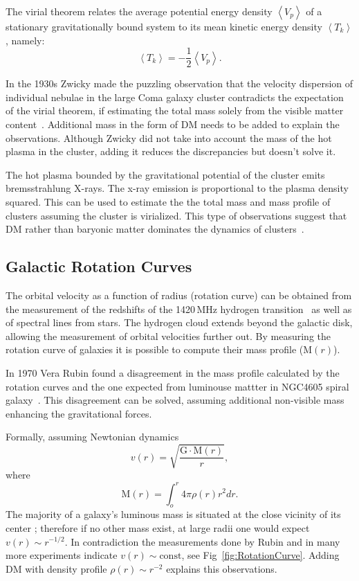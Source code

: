 The virial theorem relates the average potential energy density $\left\langle V_p \right\rangle$ of a stationary gravitationally bound system to its mean kinetic energy density $\left\langle T_k \right\rangle $, namely:
\begin{equation}
\left\langle T_k \right\rangle  =-\frac{1}{2}\left\langle V_p \right\rangle.
\end{equation}


In the 1930s Zwicky made the puzzling observation that the velocity dispersion of individual nebulae in the large Coma galaxy cluster contradicts the expectation of the virial theorem, if estimating the total mass solely from the visible matter content~\cite{Zwicky:1937zza}. Additional mass in the form of DM needs to be added to explain the observations. Although Zwicky did not take into account the mass of the hot plasma in the cluster, adding it reduces the discrepancies but doesn't solve it. 

The hot plasma bounded by the gravitational potential of the cluster emits bremsstrahlung X-rays. The x-ray emission is proportional to the plasma density squared. This can be used to estimate the the total mass and mass profile of clusters assuming the cluster is virialized. This type of observations suggest that DM rather than baryonic matter dominates the dynamics of clusters~\cite{Lewis:2002mfa}.

 


\subsection{Galactic Rotation Curves}

The orbital velocity as a function of radius (rotation curve) can be obtained from the measurement of the redshifts of the 1420\,MHz hydrogen transition~\cite{Begeman:1991iy} as well as of spectral lines from stars. The hydrogen cloud extends beyond the galactic disk, allowing the measurement of orbital velocities further out. By measuring the rotation curve of galaxies it is possible to compute their mass profile ($\textrm{M}(r)$).

In 1970 Vera Rubin found a disagreement in the mass profile calculated by the rotation curves and the one expected from luminouse mattter in NGC4605 spiral galaxy~\cite{Rubin:1980zd}. This disagreement can be solved, assuming additional non-visible mass enhancing the gravitational forces.

Formally, assuming Newtonian dynamics
\begin{equation}
\label{v_r}
v(r) = \sqrt{\frac{\mathrm{G}\cdot \mathrm{M}(r)}{r}},
\end{equation} 
where
\begin{equation}
\label{M_r}
\mathrm{M}(r) =  \int_o^r 4\pi \rho(r)r^2dr.
\end{equation}
The majority of a galaxy's luminous mass is situated at the close vicinity of its center  ; therefore if no other mass exist, at large radii one would expect $v(r) \sim r^{-1/2}$. In contradiction the measurements done by Rubin and in many more experiments indicate $v(r) \sim \mathrm{const}$, see Fig~\ref{fig:RotationCurve}. Adding DM with density profile $\rho(r) \sim r^{-2}$ explains this observations.

